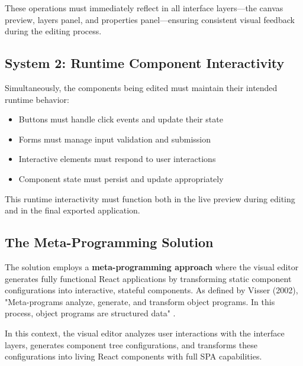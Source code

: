 \documentclass[oneside,11pt]{book}
\begin{document}
These operations must immediately reflect in all interface layers—the canvas preview, layers panel, and properties panel—ensuring consistent visual feedback during the editing process.

\subsection{System 2: Runtime Component Interactivity}
Simultaneously, the components being edited must maintain their intended runtime behavior:
\begin{itemize}
    \item Buttons must handle click events and update their state
    \item Forms must manage input validation and submission
    \item Interactive elements must respond to user interactions
    \item Component state must persist and update appropriately
\end{itemize}

This runtime interactivity must function both in the live preview during editing and in the final exported application.

\subsection{The Meta-Programming Solution}

The solution employs a \textbf{meta-programming approach} where the visual editor generates fully functional React applications by transforming static component configurations into interactive, stateful components. As defined by Visser (2002), "Meta-programs analyze, generate, and transform object programs. In this process, object programs are structured data" \cite{visser2002}.

In this context, the visual editor analyzes user interactions with the interface layers, generates component tree configurations, and transforms these configurations into living React components with full \gls{SPA} capabilities.
\end{document}
